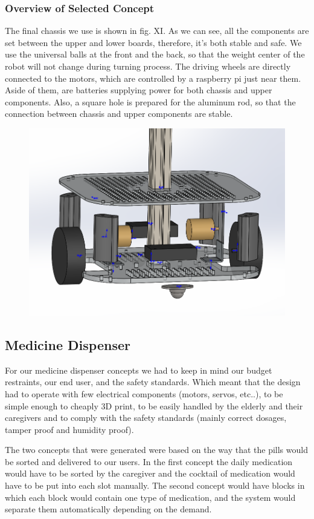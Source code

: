 \documentclass[12pt]{article}
\begin{document}
\subsubsection{Overview of Selected Concept}
The final chassis we use is shown in fig. XI. As we can see, all the components are set between the upper and lower boards, therefore, it’s both stable and safe. We use the universal balls at the front and the back, so that the weight center of the robot will not change during turning process. The driving wheels are directly connected to the motors, which are controlled by a raspberry pi just near them. Aside of them, are batteries supplying power for both chassis and upper components. Also, a square hole is prepared for the aluminum rod, so that the connection between chassis and upper components are stable.
\begin{figure}[H]
	\centering
	\includegraphics[width=0.7\linewidth]{Z3}
\end{figure}
\subsection{Medicine Dispenser}
For our medicine dispenser concepts we had to keep in mind our budget restraints, our end user, and the safety standards. Which meant that the design had to operate with few electrical components (motors, servos, etc..), to be simple enough to cheaply 3D print, to be easily handled by the elderly and their caregivers and to comply with the safety standards (mainly correct dosages, tamper proof and humidity proof).
\par The two concepts that were generated were based on the way that the pills would be sorted and delivered to our users. In the first concept the daily medication would have to be sorted by the caregiver and the cocktail of medication would have to be put into each slot manually. The second concept would have blocks in which each block would contain one type of medication, and the system would separate them automatically depending on the demand.
\end{document}
